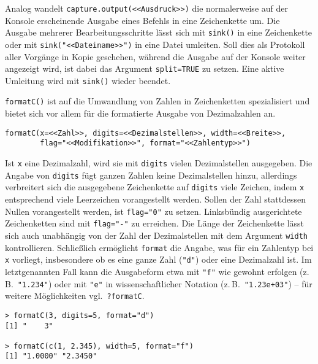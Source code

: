 Analog wandelt \lstinline!capture.output(<<Ausdruck>>)! die normalerweise auf der Konsole erscheinende Ausgabe eines Befehls in eine Zeichenkette um. Die Ausgabe mehrerer Bearbeitungsschritte lässt sich mit \lstinline!sink()! in eine Zeichenkette oder mit \lstinline!sink("<<Dateiname>>")! in eine Datei umleiten. Soll dies als Protokoll aller Vorgänge in Kopie geschehen, während die Ausgabe auf der Konsole weiter angezeigt wird, ist dabei das Argument \lstinline!split=TRUE! zu setzen. Eine aktive Umleitung wird mit \lstinline!sink()! wieder beendet.

\lstinline!formatC()! ist auf die Umwandlung von Zahlen in Zeichenketten spezialisiert und bietet sich vor allem für die formatierte Ausgabe von Dezimalzahlen an.
\begin{lstlisting}
formatC(x=<<Zahl>>, digits=<<Dezimalstellen>>, width=<<Breite>>,
        flag="<<Modifikation>>", format="<<Zahlentyp>>")
\end{lstlisting}

Ist \lstinline!x! eine Dezimalzahl, wird sie mit \lstinline!digits! vielen Dezimalstellen ausgegeben. Die Angabe von \lstinline!digits! fügt ganzen Zahlen keine Dezimalstellen hinzu, allerdings verbreitert sich die ausgegebene Zeichenkette auf \lstinline!digits! viele Zeichen, indem \lstinline!x! entsprechend viele Leerzeichen vorangestellt werden. Sollen der Zahl stattdessen Nullen vorangestellt werden, ist \lstinline!flag="0"! zu setzen. Linksbündig ausgerichtete Zeichenketten sind mit \lstinline!flag="-"! zu erreichen. Die Länge der Zeichenkette lässt sich auch unabhängig von der Zahl der Dezimalstellen mit dem Argument \lstinline!width! kontrollieren. Schließlich ermöglicht \lstinline!format! die Angabe, was für ein Zahlentyp bei \lstinline!x! vorliegt, insbesondere ob es eine ganze Zahl (\lstinline!"d"!) oder eine Dezimalzahl ist. Im letztgenannten Fall kann die Ausgabeform etwa mit \lstinline!"f"! wie gewohnt erfolgen (z.\,B.\ \lstinline!"1.234"!) oder mit \lstinline!"e"! in wissenschaftlicher Notation (z.\,B.\ \lstinline!"1.23e+03"!) -- für weitere Möglichkeiten vgl.\ \lstinline!?formatC!\@.
\begin{lstlisting}
> formatC(3, digits=5, format="d")
[1] "    3"

> formatC(c(1, 2.345), width=5, format="f")
[1] "1.0000" "2.3450"
\end{lstlisting}

